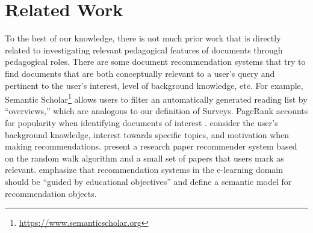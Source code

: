 \documentclass[11pt,a4paper]{article}
\begin{document}
\section{Related Work}
\label{sec:related}


To the best of our knowledge, there is not much prior work that is directly related to investigating relevant pedagogical features of documents through pedagogical roles. There are some document recommendation systems that try to find documents that are both conceptually relevant to a user's query and pertinent to the user's interest, level of background knowledge, etc. For example, Semantic Scholar\footnote{\url{https://www.semanticscholar.org}} allows users to filter an automatically generated reading list by ``overviews,'' which are analogous to our definition of Surveys. PageRank accounts for popularity when identifying documents of interest \cite{page1999pagerank}. \citet{tang2004pedagogically} consider the user's background knowledge, interest towards specific topics, and motivation when making recommendations. \citet{gori2006research} present a research paper recommender system based on the random walk algorithm and a small set of papers that users mark as relevant. \citet{santos2010modeling} emphasize that recommendation systems in the e-learning domain should be ``guided by educational objectives'' and define a semantic model for recommendation objects.
\end{document}
